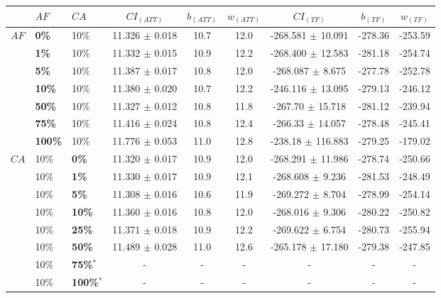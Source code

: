 \begin{sidewaystable}
    \begin{tabular}{|l|l|l||c|c|c|c|c|c|}
    \hline
    ~ & $AF$ & $CA$ & $CI_{(ATT)}$ & $b_{(ATT)}$ & $w_{(ATT)}$ & $CI_{(TF)}$ & $b_{(TF)}$ & $w_{(TF)}$ \\
    \hline
    $AF$ & \textbf{0\%} & 10\% & 11.326 $\pm$ 0.018 & 10.7 & 12.0 & -268.581 $\pm$ 10.091 & -278.36 & -253.59 \\
    ~ & \textbf{1\%} & 10\% & 11.332 $\pm$ 0.015 & 10.9 & 12.2 & -268.400 $\pm$ 12.583  & -281.18 & -254.74 \\
    ~ & \textbf{5\%} & 10\% & 11.387 $\pm$ 0.017 & 10.8 & 12.0 & -268.087 $\pm$ 8.675 & -277.78 & -252.78 \\ 
    ~ & \textbf{10\%} & 10\% & 11.380 $\pm$ 0.020 & 10.7 & 12.2 & -246.116 $\pm$ 13.095 & -279.13 & -246.12 \\ 
    ~ & \textbf{50\%} & 10\% & 11.327 $\pm$ 0.012 & 10.8 & 11.8 & -267.70 $\pm$ 15.718 & -281.12& -239.94 \\ 
    ~ & \textbf{75\%} & 10\% & 11.416 $\pm$ 0.024 & 10.8 & 12.4 & -266.33 $\pm$ 14.057 & -278.48 & -245.41 \\ 
    ~ & \textbf{100\%} & 10\% & 11.776 $\pm$ 0.053 & 11.0 & 12.8 & -238.18 $\pm$ 116.883 & -279.25 & -179.02 \\ 
    \hline
    $CA$ & 10\% &\textbf{0\%} & 11.320 $\pm$ 0.017 & 10.9 & 12.0 & -268.291 $\pm$ 11.986 & -278.74 & -250.66 \\
    ~ & 10\% &\textbf{1\%} & 11.330 $\pm$ 0.017 & 10.9 & 12.1 & -268.608 $\pm$ 9.236 & -281.53 & -248.49 \\
    ~ & 10\% &\textbf{5\%} & 11.308 $\pm$ 0.016 & 10.6 & 11.9 & -269.272 $\pm$ 8.704 & -278.99 & -254.14 \\
    ~ & 10\% &\textbf{10\%} & 11.360 $\pm$ 0.016 & 10.8 & 12.0 & -268.016 $\pm$ 9.306 & -280.22 & -250.82 \\
    ~ & 10\% &\textbf{25\%} & 11.371 $\pm$ 0.018 & 10.9 & 12.2 & -269.622 $\pm$ 6.754 & -280.73 & -255.94 \\
    ~ & 10\% &\textbf{50\%} & 11.489 $\pm$ 0.028 & 11.0 & 12.6 & -265.178 $\pm$ 17.180 & -279.38 & -247.85 \\
    ~ & 10\% &\textbf{75\%$^*$} & - & - & - & - & - & - \\
    ~ & 10\% &\textbf{100\%$^*$} & - & - & - & - & - & - \\
    \hline
    \end{tabular}

\end{sidewaystable}
